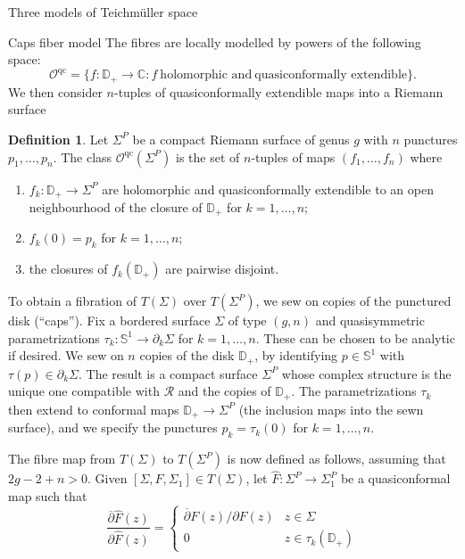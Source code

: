 \documentclass[12pt]{amsart}
\newcommand{\disk}{\ensuremath{\mathbb{D}} } %
\newcommand{\riem}{\Sigma}  %
\theoremstyle{plain}
\theoremstyle{definition}
\newtheorem{definition}[theorem]{Definition}
\theoremstyle{remark}
\numberwithin{equation}{section} %
\numberwithin{figure}{section} %
\begin{document}
\begin{section}{Three models of Teichm\"uller space}
\begin{subsection}{Caps fiber model}
The fibres are locally modelled by powers of the following space:   
 \[ \mathcal{O}^{\mathrm{qc}} = \{ f: \disk_+ \rightarrow \mathbb{C} : f \ \mathrm{holomorphic\,\, and} \ \mathrm{quasiconformally\,\, extendible} \}.     \]
 We then consider $n$-tuples of quasiconformally extendible maps into a Riemann surface 
\begin{definition} \label{de:standard_Oqc} Let ${\riem}^P$ be a compact Riemann surface of genus $g$  with $n$ punctures $p_1,\ldots,p_n$. 
 The class $\mathcal{O}^{\mathrm{qc}}({\riem}^P)$ is the set of $n$-tuples of maps 
 $(f_1,\ldots,f_n)$ where 
 \begin{enumerate}
     \item $f_k:\disk_+ \rightarrow {\riem}^P$ are holomorphic and quasiconformally extendible to an open neighbourhood of the closure of $\disk_+$ for $k=1,\ldots,n$;
     \item $f_k(0)=p_k$ for $k=1,\ldots,n$;
     \item the closures of $f_k(\disk_+)$ are pairwise disjoint.
 \end{enumerate}
\end{definition} 
 
To obtain a fibration of $T(\riem)$ over $T(\riem^P)$, we sew on copies of the punctured disk (``caps'').  Fix a bordered surface $\riem$ of type $(g,n)$ and quasisymmetric parametrizations $\tau_k:\mathbb{S}^1 \rightarrow \partial_k \riem$ for $k=1,\ldots,n$. These can be chosen to be analytic if desired. We sew on $n$ copies of the disk $\disk_+$, by identifying $p \in \mathbb{S}^1$ with $\tau(p) \in \partial_k \riem$. The result is a compact surface $\riem^P$ whose complex structure is the unique one compatible with $\mathscr{R}$ and the copies of $\disk_+$. The parametrizations $\tau_k$ then extend to conformal maps $\disk_+ \rightarrow \riem^P$ (the inclusion maps into the sewn surface), and we specify the punctures $p_k=\tau_k(0)$ for $k=1,\ldots,n$. 

The fibre map from $T(\riem)$ to $T(\riem^P)$ is now defined as follows, assuming that $2g-2+n>0$. Given $[\riem,F,\riem_1] \in T(\riem)$, let $\hat{F}:\riem^P \rightarrow \riem^P_1$ be a quasiconformal map such that 
\[  \frac{\overline{\partial} \hat{F}(z)}{\partial \hat{F}(z)} = \left\{  \begin{array}{cc}  \overline{\partial}{F}(z)/\partial F(z)  & z \in \riem \\ 0 & z \in \tau_k(\disk_+)  \end{array} \right.  \]


\end{subsection}
\end{section}
\end{document}

